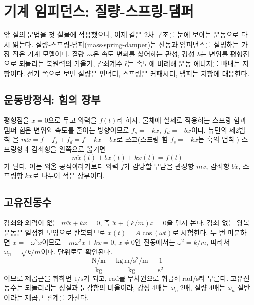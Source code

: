 \section{기계 임피던스: 질량-스프링-댐퍼}
\label{sec:u3-mechanical}

앞 절의 문법을 첫 실물에 적용했으니, 이제 같은 2차 구조를 눈에 보이는 운동으로 다시
읽는다.
질량-스프링-댐퍼(mass-spring-damper)는 진동과 임피던스를 설명하는 가장 작은 기계
모델이다.
질량 $m$은 속도 변화를 싫어하는 관성, 강성 $k$는 변위를 평형점으로 되돌리는 복원력의
기울기, 감쇠계수 $b$는 속도에 비례해 운동 에너지를 빼내는 저항이다.
전기 쪽으로 보면 질량은 인덕터, 스프링은 커패시터, 댐퍼는 저항에 대응한다.

\subsection{운동방정식: 힘의 장부}

평형점을 $x=0$으로 두고 외력을 $f(t)$라 하자.
물체에 실제로 작용하는 스프링 힘과 댐퍼 힘은 변위와 속도를 줄이는 방향이므로
$f_s=-kx$, $f_d=-b\dot{x}$이다.
뉴턴의 제2법칙 \cite{newton1687principia}을 $m\ddot{x}=f+f_s+f_d=f-kx-b\dot{x}$로 쓰고(스프링 힘 $f_s=-kx$는 훅의 법칙 \cite{hooke1678depotentiarestitutiva}) 스프링항과 감쇠항을
왼쪽으로 옮기면
\begin{equation}
  m\ddot{x}(t)+b\dot{x}(t)+kx(t)=f(t)
  \label{eq:u3m-msd}
\end{equation}
가 된다.
이는 외울 공식이라기보다 외력 $f$가 감당할 부담을 관성항 $m\ddot{x}$, 감쇠항
$b\dot{x}$, 스프링항 $kx$로 나누어 적은 장부이다.

\subsection{고유진동수}

감쇠와 외력이 없는 $m\ddot{x}+kx=0$, 즉 $\ddot{x}+(k/m)x=0$을 먼저 본다.
감쇠 없는 왕복 운동은 일정한 모양으로 반복되므로 $x(t)=A\cos(\omega t)$로 시험한다.
두 번 미분하면 $\ddot{x}=-\omega^2 x$이므로 $-m\omega^2 x+kx=0$, $x\neq0$인 진동에서는
$\omega^2=k/m$, 따라서 $\omega_n=\sqrt{k/m}$이다.
단위로도 확인된다.
\begin{equation}
  \frac{\mathrm{N/m}}{\mathrm{kg}}
  =
  \frac{\mathrm{kg\,m/s^2}/\mathrm{m}}{\mathrm{kg}}
  =
  \frac{1}{\mathrm{s^2}}
\end{equation}
이므로 제곱근을 취하면 $1/\mathrm{s}$가 되고, rad를 무차원으로 취급해 rad/s라 부른다.
고유진동수는 되돌리려는 성질과 둔감함의 비율이라, 강성 4배는 $\omega_n$ 2배, 질량 4배는
$\omega_n$ 절반이라는 제곱근 관계를 가진다.

